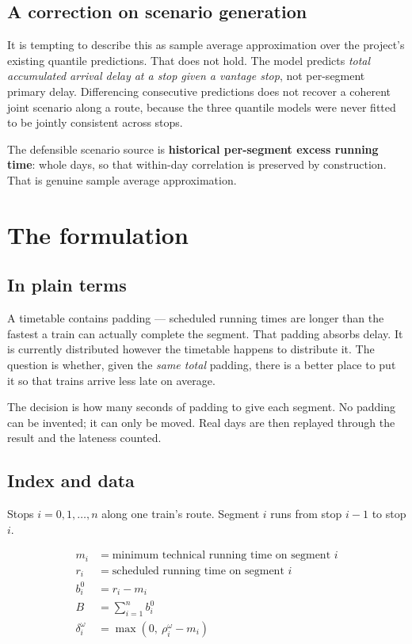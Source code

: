 \documentclass[11pt,a4paper]{article}
\begin{document}
\subsection*{A correction on scenario generation}

It is tempting to describe this as sample average approximation over the project's existing
quantile predictions. That does not hold. The model predicts \emph{total accumulated arrival
delay at a stop given a vantage stop}, not per-segment primary delay. Differencing
consecutive predictions does not recover a coherent joint scenario along a route, because
the three quantile models were never fitted to be jointly consistent across stops.

The defensible scenario source is \textbf{historical per-segment excess running time}: whole
days, so that within-day correlation is preserved by construction. That is genuine sample
average approximation.

\section{The formulation}

\subsection*{In plain terms}

A timetable contains padding --- scheduled running times are longer than the fastest a train
can actually complete the segment. That padding absorbs delay. It is currently distributed
however the timetable happens to distribute it. The question is whether, given the
\emph{same total} padding, there is a better place to put it so that trains arrive less late
on average.

The decision is how many seconds of padding to give each segment. No padding can be
invented; it can only be moved. Real days are then replayed through the result and the
lateness counted.

\subsection*{Index and data}

Stops $i = 0, 1, \dots, n$ along one train's route. Segment $i$ runs from stop $i-1$ to
stop $i$.

\[
\begin{aligned}
m_i &= \text{minimum technical running time on segment } i \\
r_i &= \text{scheduled running time on segment } i \\
b_i^0 &= r_i - m_i \\
B &= \textstyle\sum_{i=1}^{n} b_i^0 \\
\delta_i^\omega &= \max\!\left(0,\ \rho_i^\omega - m_i\right)
\end{aligned}
\]
\end{document}
